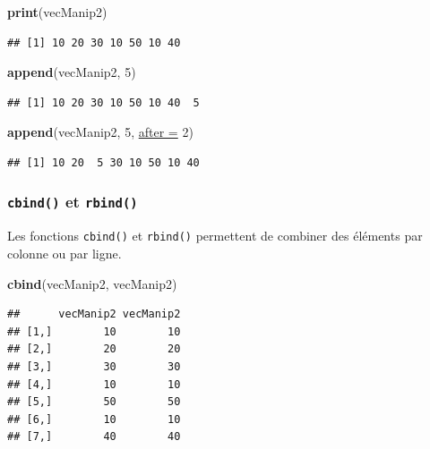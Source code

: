 \documentclass[twoside,symmetric]{book}
\newenvironment{Shaded}{}{}
\newcommand{\DataTypeTok}[1]{\underline{#1}}
\newcommand{\DecValTok}[1]{#1}
\newcommand{\KeywordTok}[1]{\textbf{#1}}
\newcommand{\NormalTok}[1]{#1}
\begin{document}
\begin{Shaded}
\begin{Highlighting}[]
\KeywordTok{print}\NormalTok{(vecManip2)}
\end{Highlighting}
\end{Shaded}

\begin{verbatim}
## [1] 10 20 30 10 50 10 40
\end{verbatim}

\begin{Shaded}
\begin{Highlighting}[]
\KeywordTok{append}\NormalTok{(vecManip2, }\DecValTok{5}\NormalTok{)}
\end{Highlighting}
\end{Shaded}

\begin{verbatim}
## [1] 10 20 30 10 50 10 40  5
\end{verbatim}

\begin{Shaded}
\begin{Highlighting}[]
\KeywordTok{append}\NormalTok{(vecManip2, }\DecValTok{5}\NormalTok{, }\DataTypeTok{after =} \DecValTok{2}\NormalTok{)}
\end{Highlighting}
\end{Shaded}

\begin{verbatim}
## [1] 10 20  5 30 10 50 10 40
\end{verbatim}

\hypertarget{l015cbind}{%
\subsubsection{\texorpdfstring{\texttt{cbind()} et \texttt{rbind()}}{cbind() et rbind()}}\label{l015cbind}}

Les fonctions \texttt{cbind()} et \texttt{rbind()} permettent de combiner des éléments par colonne ou par ligne.

\begin{Shaded}
\begin{Highlighting}[]
\KeywordTok{cbind}\NormalTok{(vecManip2, vecManip2)}
\end{Highlighting}
\end{Shaded}

\begin{verbatim}
##      vecManip2 vecManip2
## [1,]        10        10
## [2,]        20        20
## [3,]        30        30
## [4,]        10        10
## [5,]        50        50
## [6,]        10        10
## [7,]        40        40
\end{verbatim}
\end{document}

